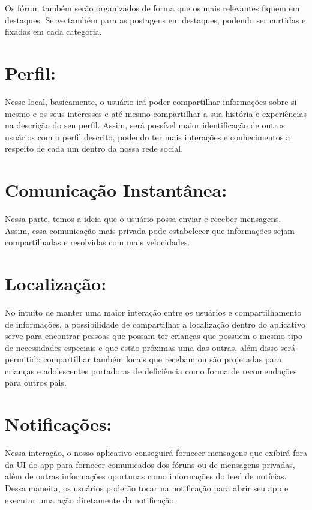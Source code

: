 \documentclass[
    12pt,               %
    openright,          %
    oneside,
    a4paper,            %
    paginasA3,  %
    BIBLATEX,           %
    REFINDENT,          %
    MODELO,             %
    TODO,               %
    english,            %
    brazil              %
    ]{ifsp-spo-inf-ctds} %
\begin{document}
\begin{apendicesenv}
Os fórum também serão organizados de forma que os mais relevantes fiquem em destaques. Serve também para as postagens em destaques, podendo ser curtidas e fixadas em cada categoria. 

\section{Perfil:}
Nesse local, basicamente, o usuário irá poder compartilhar informações sobre si mesmo e os seus interesses e até mesmo compartilhar a sua história e experiências na descrição do seu perfil. Assim, será possível maior identificação de outros usuários com o perfil descrito, podendo ter mais interações e conhecimentos a respeito de cada um dentro da nossa rede social. 

\section{Comunicação Instantânea: }
Nessa parte, temos a ideia que o usuário possa enviar e receber mensagens. Assim, essa comunicação mais privada pode estabelecer que informações sejam compartilhadas e resolvidas com mais velocidades. 

\section{Localização: }
No intuito de manter uma maior interação entre os usuários e compartilhamento de informações, a possibilidade de compartilhar a localização dentro do aplicativo serve para encontrar pessoas que possam ter crianças que possuem o mesmo tipo de  necessidades especiais e que estão próximas uma das outras, além disso será permitido compartilhar também locais que recebam ou são projetadas para crianças e adolescentes portadoras de deficiência como forma de recomendações para outros pais. 

\section{Notificações: }
Nessa interação, o nosso aplicativo conseguirá fornecer mensagens que exibirá fora da UI do app para fornecer comunicados dos fóruns ou de mensagens privadas, além de outras informações oportunas como informações do feed de notícias. Dessa maneira, os usuários poderão tocar na notificação para abrir seu app e executar uma ação diretamente da notificação. 




\end{apendicesenv}
\end{document}
